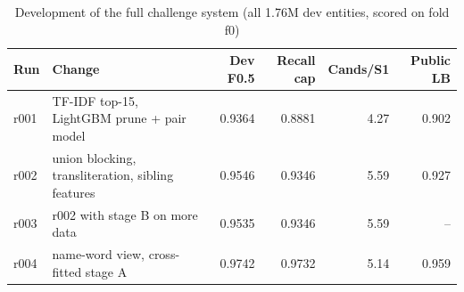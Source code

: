 \begin{table}[t]
\centering
\footnotesize
\caption{Development of the full challenge system (all 1.76M dev entities, scored on fold f0)}
\label{tab:challenge}
\begin{tabular}{llrrrr}
\toprule
Run & Change & Dev F0.5 & Recall cap & Cands/S1 & Public LB \\
\midrule
r001 & TF-IDF top-15, LightGBM prune + pair model & 0.9364 & 0.8881 & 4.27 & 0.902 \\
r002 & union blocking, transliteration, sibling features & 0.9546 & 0.9346 & 5.59 & 0.927 \\
r003 & r002 with stage B on more data & 0.9535 & 0.9346 & 5.59 & -- \\
r004 & name-word view, cross-fitted stage A & 0.9742 & 0.9732 & 5.14 & 0.959 \\
\bottomrule
\end{tabular}
\end{table}
